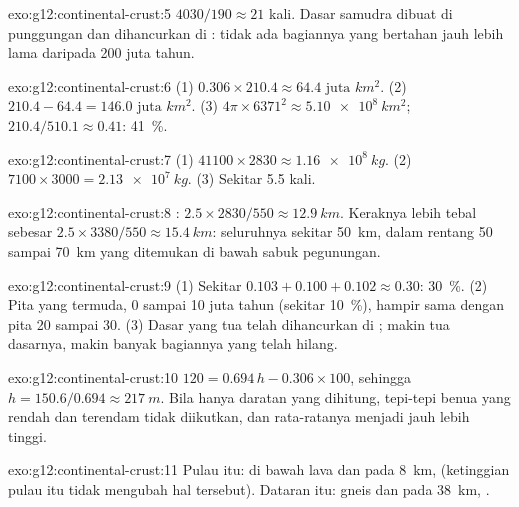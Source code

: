 \begin{solution}{exo:g12:continental-crust:5}
$4030/190 \approx 21$ kali. Dasar samudra dibuat di punggungan dan
dihancurkan di : tidak ada bagiannya yang bertahan jauh lebih lama
daripada 200 juta tahun.
\end{solution}

\begin{solution}{exo:g12:continental-crust:6}
(1) $0.306 \times 210.4 \approx \num{64.4}\text{ juta }\unit{km^2}$.
(2) $210.4 - 64.4 = \num{146.0}\text{ juta }\unit{km^2}$.
(3) $4\pi \times 6371^2 \approx \qty{5.10e8}{km^2}$; $210.4/510.1 \approx
0.41$: \qty{41}{\percent}.
\end{solution}

\begin{solution}{exo:g12:continental-crust:7}
(1) $41100 \times 2830 \approx \qty{1.16e8}{kg}$. (2) $7100 \times 3000 =
\qty{2.13e7}{kg}$. (3) Sekitar 5.5 kali.
\end{solution}

\begin{solution}{exo:g12:continental-crust:8}
: $2.5 \times 2830/550 \approx \qty{12.9}{km}$. Keraknya lebih tebal
sebesar $2.5 \times 3380/550 \approx \qty{15.4}{km}$: seluruhnya sekitar
\qty{50}{km}, dalam rentang 50 sampai \qty{70}{km} yang ditemukan di bawah
sabuk pegunungan.
\end{solution}

\begin{solution}{exo:g12:continental-crust:9}
(1) Sekitar $0.103 + 0.100 + 0.102 \approx 0.30$: \qty{30}{\percent}.
(2) Pita yang termuda, 0 sampai 10 juta tahun (sekitar \qty{10}{\percent}),
hampir sama dengan pita 20 sampai 30. (3) Dasar yang tua telah dihancurkan di
; makin tua dasarnya, makin banyak bagiannya yang telah hilang.
\end{solution}

\begin{solution}{exo:g12:continental-crust:10}
$120 = 0.694\,h - 0.306 \times 100$, sehingga $h = 150.6/0.694 \approx
\qty{217}{m}$. Bila hanya daratan yang dihitung, tepi-tepi benua yang rendah
dan terendam tidak diikutkan, dan rata-ratanya menjadi jauh lebih tinggi.
\end{solution}

\begin{solution}{exo:g12:continental-crust:11}
Pulau itu:  di bawah lava dan  pada \qty{8}{km}, 
(ketinggian pulau itu tidak mengubah hal tersebut). Dataran itu: gneis dan
 pada \qty{38}{km}, .
\end{solution}


